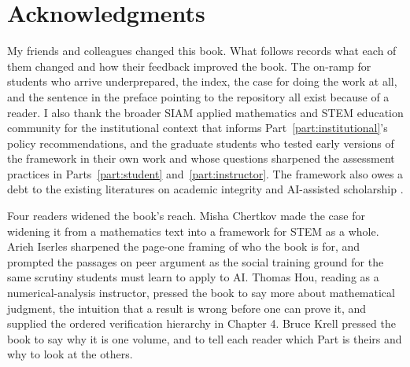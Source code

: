 \documentclass{SIAMbook2023}
\begin{document}

\section*{Acknowledgments}

My friends and colleagues changed this book. What follows records what each of them changed and how their feedback improved the book. The on-ramp for students who arrive underprepared, the index, the case for doing the work at all, and the sentence in the preface pointing to the repository all exist because of a reader. I also thank the broader SIAM applied mathematics and STEM education community for the institutional context that informs Part~\ref{part:institutional}'s policy recommendations, and the graduate students who tested early versions of the framework in their own work and whose questions sharpened the assessment practices in Parts~\ref{part:student} and~\ref{part:instructor}. The framework also owes a debt to the existing literatures on academic integrity \citep{mccabe1993academic,bertramgallant2008academic} and AI-assisted scholarship \citep{miao2023guidance,oecd2026digital,usde2023artificial}.

Four readers widened the book's reach. Misha Chertkov made the case for widening it from a mathematics text into a framework for STEM as a whole. Arieh Iserles sharpened the page-one framing of who the book is for, and prompted the passages on peer argument as the social training ground for the same scrutiny students must learn to apply to AI. Thomas Hou, reading as a numerical-analysis instructor, pressed the book to say more about mathematical judgment, the intuition that a result is wrong before one can prove it, and supplied the ordered verification hierarchy in Chapter 4. Bruce Krell pressed the book to say why it is one volume, and to tell each reader which Part is theirs and why to look at the others.
\end{document}
